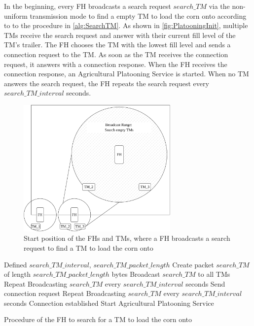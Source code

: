 In the beginning, every \ac{FH} broadcasts a search request $search\_TM$ via the non-uniform transmission mode to find a empty \ac{TM} to load the corn onto according to
to the procedure in \autoref{alg:SearchTM}.
As shown in \autoref{fig:PlatooningInit}, multiple \ac{TM}s receive the search request and answer with
their current fill level of the \ac{TM}'s trailer.
The \ac{FH} chooses the \ac{TM} with the lowest fill level and sends a connection request to the \ac{TM}.
As soon as the \ac{TM} receives the connection request, it answers with a connection response.
When the \ac{FH} receives the connection response, an Agricultural Platooning Service is started.
When no \ac{TM} answers the search request, the \ac{FH} repeats the search request every $search\_TM\_interval$ seconds.
\begin{figure}[H]%
	\centering
	\includegraphics[width=0.7\textwidth]{figures/platoonINIT}
	\caption{Start position of the \acf{FH}s and \acf{TM}s, where a \ac{FH} broadcasts a search request to find
	a \ac{TM} to load the corn onto}
	\label{fig:PlatooningInit}%
\end{figure}

\begin{algorithm}
\begin{algorithmic}[1]
\REQUIRE Defined $search\_TM\_interval$, $search\_TM\_packet\_length$
\STATE Create packet $search\_TM$ of length $search\_TM\_packet\_length$ bytes
\STATE Broadcast $search\_TM$ to all \acs{TM}s
    \STATE Repeat Broadcasting $search\_TM$ every $search\_TM\_interval$ seconds
\ELSE
	\STATE Send connection request
		\STATE Repeat Broadcasting $search\_TM$ every $search\_TM\_interval$ seconds
	\ELSE
		\STATE Connection established
		\STATE Start Agricultural Platooning Service
	\ENDIF
\ENDIF
\end{algorithmic}
\caption{Procedure of the \acf{FH} to search for a \acf{TM} to load the corn onto}
\label{alg:SearchTM}
\end{algorithm}

